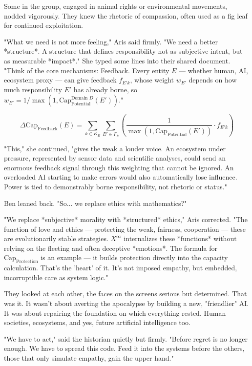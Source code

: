 \documentclass[12pt, english, parskip=full]{scrartcl} %
\begin{document}
Some in the group, engaged in animal rights or environmental movements, nodded vigorously. They knew the rhetoric of compassion, often used as a fig leaf for continued exploitation.

"What we need is not more feeling," Aris said firmly. "We need a better *structure*. A structure that defines responsibility not as subjective intent, but as measurable *impact*." She typed some lines into their shared document. "Think of the core mechanisms: Feedback. Every entity $E$ — whether human, AI, ecosystem proxy — can give feedback $f_{E'k}$, whose weight $w_{E'}$ depends on how much responsibility $E'$ has already borne, so $w_{E'} = 1/\max(1, \text{Cap}_{\text{Potential}}^{\text{Domain } D}(E'))$."

$$ \Delta \text{Cap}_{\text{Feedback}}(E) = \sum_{k \in K_E} \sum_{E' \in F_k} \left( \frac{1}{\max(1, \text{Cap}_{\text{Potential}}(E'))} \cdot f_{E'k} \right) $$

"This," she continued, "gives the weak a louder voice. An ecosystem under pressure, represented by sensor data and scientific analyses, could send an enormous feedback signal through this weighting that cannot be ignored. An overloaded AI starting to make errors would also automatically lose influence. Power is tied to demonstrably borne responsibility, not rhetoric or status."

Ben leaned back. "So... we replace ethics with mathematics?"

"We replace *subjective* morality with *structured* ethics," Aris corrected. "The function of love and ethics — protecting the weak, fairness, cooperation — these are evolutionarily stable strategies. $X^{\infty}$ internalizes these *functions* without relying on the fleeting and often deceptive *emotions*. The formula for $\text{Cap}_{\text{Protection}}$ is an example — it builds protection directly into the capacity calculation. That’s the 'heart' of it. It’s not imposed empathy, but embedded, incorruptible care as system logic."

They looked at each other, the faces on the screens serious but determined. That was it. It wasn’t about averting the apocalypse by building a new, "friendlier" AI. It was about repairing the foundation on which everything rested. Human societies, ecosystems, and yes, future artificial intelligence too.

"We have to act," said the historian quietly but firmly. "Before regret is no longer enough. We have to spread this code. Feed it into the systems before the others, those that only simulate empathy, gain the upper hand."
\end{document}

